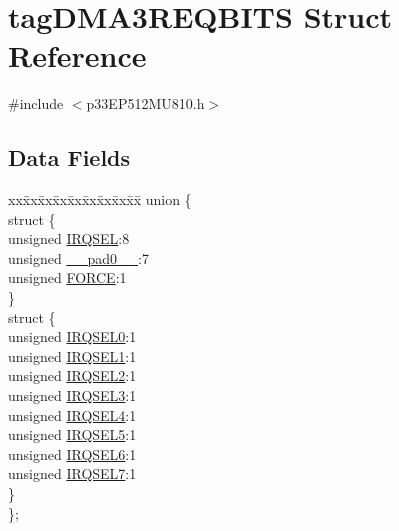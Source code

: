 \hypertarget{structtag_d_m_a3_r_e_q_b_i_t_s}{}\section{tag\+D\+M\+A3\+R\+E\+Q\+B\+I\+TS Struct Reference}
\label{structtag_d_m_a3_r_e_q_b_i_t_s}


{\ttfamily \#include $<$p33\+E\+P512\+M\+U810.\+h$>$}

\subsection*{Data Fields}
\begin{DoxyCompactItemize}
\item 
\begin{tabbing}
xx\=xx\=xx\=xx\=xx\=xx\=xx\=xx\=xx\=\kill
union \{\\
\>struct \{\\
\>\>unsigned \hyperlink{structtag_d_m_a3_r_e_q_b_i_t_s_a5e70ba01366ab2f37371d52661dd93b2}{IRQSEL}:8\\
\>\>unsigned \hyperlink{structtag_d_m_a3_r_e_q_b_i_t_s_adf71f3d8410c1f1dbbc96680a92c49af}{\_\_pad0\_\_}:7\\
\>\>unsigned \hyperlink{structtag_d_m_a3_r_e_q_b_i_t_s_a9b378a7ffc1ab4bc4a3710fb36389180}{FORCE}:1\\
\>\} \\
\>struct \{\\
\>\>unsigned \hyperlink{structtag_d_m_a3_r_e_q_b_i_t_s_ac73241b8f783760c9192dfd8a0773cad}{IRQSEL0}:1\\
\>\>unsigned \hyperlink{structtag_d_m_a3_r_e_q_b_i_t_s_a45e1f083e5a8a59f25acc35910732426}{IRQSEL1}:1\\
\>\>unsigned \hyperlink{structtag_d_m_a3_r_e_q_b_i_t_s_a60dda7474727b3624ca25fa0067a8924}{IRQSEL2}:1\\
\>\>unsigned \hyperlink{structtag_d_m_a3_r_e_q_b_i_t_s_aeaafe1b8c89398ed382054ab628aed78}{IRQSEL3}:1\\
\>\>unsigned \hyperlink{structtag_d_m_a3_r_e_q_b_i_t_s_a91c4162e0f3d4ac7adcdb49302f19840}{IRQSEL4}:1\\
\>\>unsigned \hyperlink{structtag_d_m_a3_r_e_q_b_i_t_s_a6382d50430464cf20b3dee3dbf2e8c01}{IRQSEL5}:1\\
\>\>unsigned \hyperlink{structtag_d_m_a3_r_e_q_b_i_t_s_ace52408ef8c29561f3c56a3fbcbc8217}{IRQSEL6}:1\\
\>\>unsigned \hyperlink{structtag_d_m_a3_r_e_q_b_i_t_s_acce7dedecdf1f53cdbead3edf7c5d53a}{IRQSEL7}:1\\
\>\} \\
\}; \\

\end{tabbing}\end{DoxyCompactItemize}


